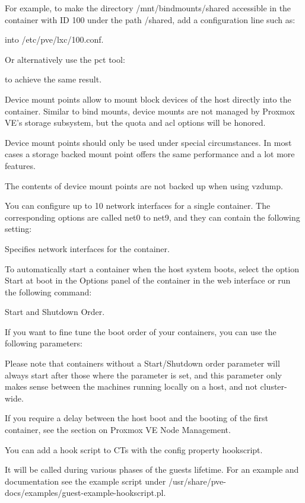 For example, to make the directory /mnt/bindmounts/shared accessible in the container with ID 100 under the path /shared, add a configuration line such as:

into /etc/pve/lxc/100.conf.

Or alternatively use the pct tool:

to achieve the same result.

Device mount points allow to mount block devices of the host directly into the container. Similar to bind mounts, device mounts are not managed by Proxmox VE’s storage subsystem, but the quota and acl options will be honored.

Device mount points should only be used under special circumstances. In most cases a storage backed mount point offers the same performance and a lot more features.

The contents of device mount points are not backed up when using vzdump.

You can configure up to 10 network interfaces for a single container. The corresponding options are called net0 to net9, and they can contain the following setting:

Specifies network interfaces for the container.

To automatically start a container when the host system boots, select the option Start at boot in the Options panel of the container in the web interface or run the following command:

Start and Shutdown Order.

If you want to fine tune the boot order of your containers, you can use the following parameters:

Please note that containers without a Start/Shutdown order parameter will always start after those where the parameter is set, and this parameter only makes sense between the machines running locally on a host, and not cluster-wide.

If you require a delay between the host boot and the booting of the first container, see the section on Proxmox VE Node Management.

You can add a hook script to CTs with the config property hookscript.

It will be called during various phases of the guests lifetime. For an example and documentation see the example script under /usr/share/pve-docs/examples/guest-example-hookscript.pl.

